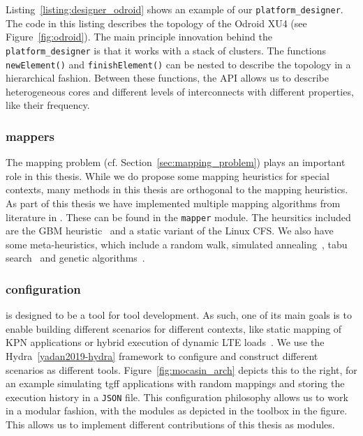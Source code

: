 Listing~\ref{listing:designer_odroid} shows an example of our \texttt{platform\_designer}.
The code in this listing describes the topology of the Odroid XU4 (see Figure~\ref{fig:odroid}). 
The main principle innovation behind the \texttt{platform\_designer} is that it works with a stack of clusters.
The functions \texttt{newElement()} and \texttt{finishElement()} can be nested to describe the topology in a hierarchical fashion.
Between these functions, the \ac{API} allows us to describe heterogeneous cores and different levels of interconnects with different properties, like their frequency.

\subsubsection{mappers}

The mapping problem (cf. Section~\ref{sec:mapping_problem}) plays an important role in this thesis.
While we do propose some mapping heuristics for special contexts, many methods in this thesis are orthogonal to the mapping heuristics.
As part of this thesis we have implemented multiple mapping algorithms from literature in \mocasin.
These can be found in the \texttt{mapper} module. 
The heursitics included are the \ac{GBM} heuristic~\cite{castrillon_dac12} and a static variant of the Linux \ac{CFS}.
We also have some meta-heuristics, which include a random walk, simulated annealing~\cite{simulated_annealig}, tabu search~\cite{tabu_search} and genetic algorithms~\cite{erbas2006multiobjective,goens_mcsoc16}. 

\subsubsection{configuration}

\mocasin is designed to be a tool for tool development.
As such, one of its main goals is to enable building different scenarios for different contexts, like static mapping of \ac{KPN} applications or hybrid execution of dynamic \ac{LTE} loads~\cite{menard_rapido21}.
We use the Hydra~\ref{yadan2019-hydra} framework to configure \mocasin and construct different scenarios as different tools.
Figure~\ref{fig:mocasin_arch} depicts this to the right, for an example simulating \ac{tgff} applications with random mappings and storing the execution history in a \texttt{JSON} file.
This configuration philosophy allows us to work in a modular fashion, with the modules as depicted in the \mocasin toolbox in the figure.
This allows us to implement different contributions of this thesis as \mocasin modules.

